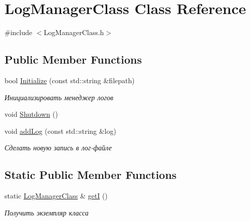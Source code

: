 \hypertarget{class_log_manager_class}{}\section{Log\+Manager\+Class Class Reference}
\label{class_log_manager_class}


{\ttfamily \#include $<$Log\+Manager\+Class.\+h$>$}

\subsection*{Public Member Functions}
\begin{DoxyCompactItemize}
\item 
bool \hyperlink{class_log_manager_class_ac251900f85adb694a74b8d17f0710c86}{Initialize} (const std\+::string \&filepath)
\begin{DoxyCompactList}\small\item\em Инициализировать менеджер логов \end{DoxyCompactList}\item 
void \hyperlink{class_log_manager_class_a1487efa7d3bd59d0b13f23f244d36451}{Shutdown} ()
\item 
void \hyperlink{class_log_manager_class_a03111f2a8bd4236efb8d2defc5c32dca}{add\+Log} (const std\+::string \&log)
\begin{DoxyCompactList}\small\item\em Сделать новую запись в лог-\/файле \end{DoxyCompactList}\end{DoxyCompactItemize}
\subsection*{Static Public Member Functions}
\begin{DoxyCompactItemize}
\item 
static \hyperlink{class_log_manager_class}{Log\+Manager\+Class} \& \hyperlink{class_log_manager_class_a30c4fbd4107f522daa4a0952ce095e6c}{getI} ()
\begin{DoxyCompactList}\small\item\em Получить экземпляр класса \end{DoxyCompactList}\end{DoxyCompactItemize}
